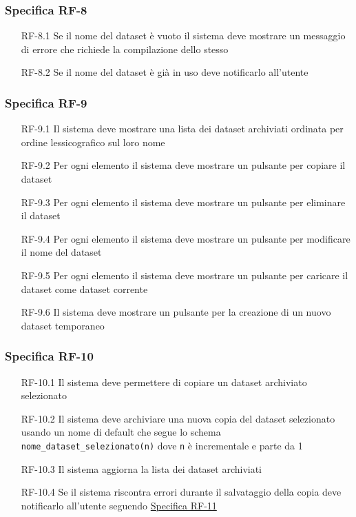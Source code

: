 \subsubsection{Specifica RF-8}
\label{subsubsec:RF-8}
\begin{enumerate}
    \item[RF-8.1] Se il nome del dataset è vuoto il sistema deve mostrare un messaggio di errore che richiede la compilazione dello stesso 
    \item[RF-8.2] Se il nome del dataset è già in uso deve notificarlo all'utente
\end{enumerate}

\subsubsection{Specifica RF-9}
\label{subsubsec:RF-9}
\begin{enumerate}
    \item[RF-9.1] Il sistema deve mostrare una lista dei dataset archiviati ordinata per ordine lessicografico sul loro nome
    \item[RF-9.2] Per ogni elemento il sistema deve mostrare un pulsante per copiare il dataset
    \item[RF-9.3] Per ogni elemento il sistema deve mostrare un pulsante per eliminare il dataset
    \item[RF-9.4] Per ogni elemento il sistema deve mostrare un pulsante per modificare il nome del dataset
    \item[RF-9.5] Per ogni elemento il sistema deve mostrare un pulsante per caricare il dataset come dataset corrente 
    \item[RF-9.6] Il sistema deve mostrare un pulsante per la creazione di un nuovo dataset temporaneo
\end{enumerate}

\subsubsection{Specifica RF-10}
\label{subsubsec:RF-10}
\begin{enumerate}
    \item[RF-10.1] Il sistema deve permettere di copiare un dataset archiviato selezionato
    \item[RF-10.2] Il sistema deve archiviare una nuova copia del dataset selezionato usando un nome di default che segue lo schema \texttt{nome\_dataset\_selezionato(n)} dove \texttt{n} è incrementale e parte da 1
    \item[RF-10.3] Il sistema aggiorna la lista dei dataset archiviati
    \item[RF-10.4] Se il sistema riscontra errori durante il salvataggio della copia deve notificarlo all'utente seguendo \hyperref[subsubsec:RF-11]{Specifica RF-11}
\end{enumerate}

